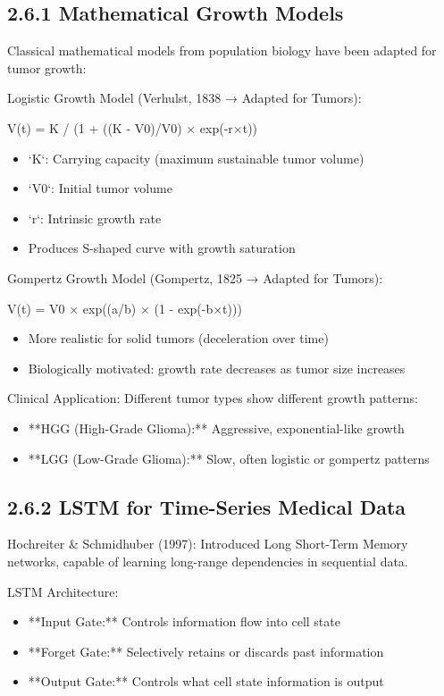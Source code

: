 \subsection{2.6.1 Mathematical Growth Models}
Classical mathematical models from population biology have been adapted for tumor growth:

Logistic Growth Model (Verhulst, 1838 → Adapted for Tumors):

V(t) = K / (1 + ((K - V0)/V0) × exp(-r×t))

\begin{itemize}
  \item `K`: Carrying capacity (maximum sustainable tumor volume)
  \item `V0`: Initial tumor volume
  \item `r`: Intrinsic growth rate
  \item Produces S-shaped curve with growth saturation
\end{itemize}

Gompertz Growth Model (Gompertz, 1825 → Adapted for Tumors):

V(t) = V0 × exp((a/b) × (1 - exp(-b×t)))

\begin{itemize}
  \item More realistic for solid tumors (deceleration over time)
  \item Biologically motivated: growth rate decreases as tumor size increases
\end{itemize}

Clinical Application: Different tumor types show different growth patterns:

\begin{itemize}
  \item **HGG (High-Grade Glioma):** Aggressive, exponential-like growth
  \item **LGG (Low-Grade Glioma):** Slow, often logistic or gompertz patterns
\end{itemize}


\subsection{2.6.2 LSTM for Time-Series Medical Data}
Hochreiter \& Schmidhuber (1997): Introduced Long Short-Term Memory networks, capable of learning long-range dependencies in sequential data.

LSTM Architecture:

\begin{itemize}
  \item **Input Gate:** Controls information flow into cell state
  \item **Forget Gate:** Selectively retains or discards past information
  \item **Output Gate:** Controls what cell state information is output
\end{itemize}


